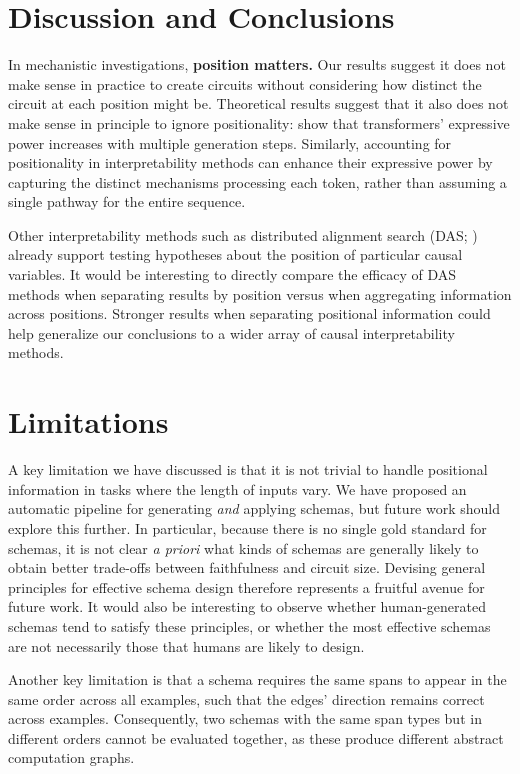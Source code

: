
\section{Discussion and Conclusions}
In mechanistic investigations, \textbf{position matters.} Our results suggest it does not make sense in practice to create circuits without considering how distinct the circuit at each position might be.
Theoretical results suggest that it also does not make sense in principle to ignore positionality: \citet{merrill2024expressivepowertransformerschain} show that transformers' expressive power increases with multiple generation steps.
Similarly, accounting for positionality in interpretability methods can enhance their expressive power by capturing the distinct mechanisms processing each token, rather than assuming a single pathway for the entire sequence.

Other interpretability methods such as distributed alignment search (DAS; \citealp{geiger2024das}) already support testing hypotheses about the position of particular causal variables. It would be interesting to directly compare the efficacy of DAS methods when separating results by position versus when aggregating information across positions. Stronger results when separating positional information could help generalize our conclusions to a wider array of causal interpretability methods.



\section*{Limitations}
A key limitation we have discussed is that it is not trivial to handle positional information in tasks where the length of inputs vary. We have proposed an automatic pipeline for generating \emph{and} applying schemas, but future work should explore this further. In particular, because there is no single gold standard for schemas, it is not clear \emph{a priori} what kinds of schemas are generally likely to obtain better trade-offs between faithfulness and circuit size. Devising general principles for effective schema design therefore represents a fruitful avenue for future work. It would also be interesting to observe whether human-generated schemas tend to satisfy these principles, or whether the most effective schemas are not necessarily those that humans are likely to design.

Another key limitation is that a schema requires the same spans to appear in the same order across all examples, such that the edges' direction remains correct across examples. Consequently, two schemas with the same span types but in different orders cannot be evaluated together, as these produce different abstract computation graphs. 


